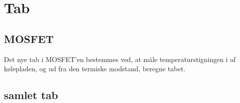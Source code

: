
\section{Tab}

\subsection{MOSFET}
Det nye tab i MOSFET'en bestemmes ved, at måle temperaturstigningen i af kølepladen, og ud fra den termiske modstand, beregne tabet. 

\subsection{samlet tab}

